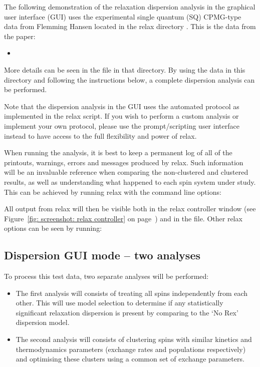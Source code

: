 The following demonstration of the relaxation dispersion analysis in the graphical user interface (GUI) uses the experimental single quantum (SQ) CPMG-type data from Flemming Hansen located in the relax directory .
This is the data from the paper:
\begin{itemize}
  \item {}
\end{itemize}

More details can be seen in the  file in that directory.
By using the data in this directory and following the instructions below, a complete dispersion analysis can be performed.

Note that the dispersion analysis in the GUI uses the automated protocol as implemented in the  relax script.
If you wish to perform a custom analysis or implement your own protocol, please use the prompt/scripting user interface instead to have access to the full flexibility and power of relax.

When running the analysis, it is best to keep a permanent log of all of the printouts, warnings, errors and messages produced by relax.
Such information will be an invaluable reference when comparing the non-clustered and clustered results, as well as understanding what happened to each spin system under study.
This can be achieved by running relax with the command line options:


All output from relax will then be visible both in the relax controller window (see Figure~\ref{fig: screenshot: relax controller} on page~\pageref{fig: screenshot: relax controller}) and in the  file.
Other relax options can be seen by running:




\subsection{Dispersion GUI mode -- two analyses}

To process this test data, two separate analyses will be performed:
\begin{itemize}
  \item The first analysis will consists of treating all spins independently from each other.
    This will use model selection to determine if any statistically significant relaxation dispersion is present by comparing to the `No Rex' dispersion model.
  \item The second analysis will consists of clustering spins with similar kinetics and thermodynamics parameters (exchange rates and populations respectively) and optimising these clusters using a common set of exchange parameters.
\end{itemize}

